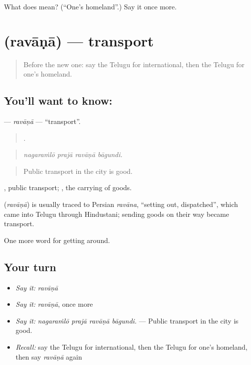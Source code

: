 \begin{tcolorbox}[breakable,colback=teal!4,colframe=teal!35!black,title={Before you move on}]
What does  mean? (\textquotedblleft{}One's homeland\textquotedblright{}.) Say it once more.
\end{tcolorbox}
\section[\texorpdfstring{\te{రవాణా} (ravāṇā)}{రవాణా (ravāṇā)}]{ (ravāṇā) — transport}

\label{lesson:TE-C454-ravana}



\begin{quote}
Before the new one: say the Telugu for international, then the Telugu for one's homeland.
\end{quote}

\subsection*{You'll want to know: }
\textbf{} — \emph{ravāṇā} — \textquotedblleft{}transport\textquotedblright{}.

\begin{quote}
   .
\end{quote}

\begin{quote}
\emph{nagaraṁlō prajā ravāṇā bāgundi.}
\end{quote}

\begin{quote}
Public transport in the city is good.
\end{quote}

 , public transport;  , the carrying of goods.

\begin{cousinweb}
\textbf{} (\emph{ravāṇā}) is usually traced to Persian \emph{ravāna}, \textquotedblleft{}setting out, dispatched\textquotedblright{}, which came into Telugu through Hindustani; sending goods on their way became transport.
\end{cousinweb}

\begin{grammarlens}[title={What you've built}]
One more word for getting around.
\end{grammarlens}

\subsection*{Your turn}
\begin{itemize}
\raggedright
  \item \emph{Say it:} \emph{ravāṇā}
  \item \emph{Say it:} \emph{ravāṇā}, once more
  \item \emph{Say it:} \emph{nagaraṁlō prajā ravāṇā bāgundi.} — Public transport in the city is good.
  \item \emph{Recall:} say the Telugu for international, then the Telugu for one's homeland, then say \emph{ravāṇā} again
\end{itemize}

